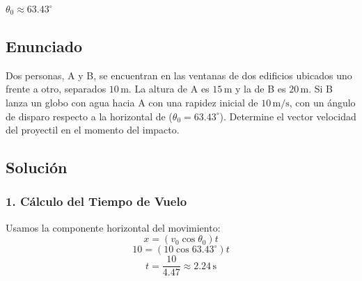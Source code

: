\documentclass[12pt, a4paper]{article}
\begin{document}
\begin{tcolorbox}[colback=blue!5!white, colframe=blue!75!black, title=Respuesta Final]
\centering
$\theta_0 \approx 63.43^\circ$
\end{tcolorbox}

\newpage

\subsection*{Enunciado}
Dos personas, A y B, se encuentran en las ventanas de dos edificios ubicados uno frente a otro, separados $10\,\text{m}$. La altura de A es $15\,\text{m}$ y la de B es $20\,\text{m}$. Si B lanza un globo con agua hacia A con una rapidez inicial de $10\,\text{m/s}$, con un ángulo de disparo respecto a la horizontal de ($\theta_0 = 63.43^\circ$). Determine el vector velocidad del proyectil en el momento del impacto.

\begin{center}
\end{center}

\subsection*{Solución}

\subsubsection*{1. Cálculo del Tiempo de Vuelo}
Usamos la componente horizontal del movimiento:
$$ x = (v_0 \cos\theta_0) t $$
$$ 10 = (10 \cos 63.43^\circ) t $$
$$ t = \frac{10}{4.47} \approx 2.24\,\text{s} $$
\end{document}

